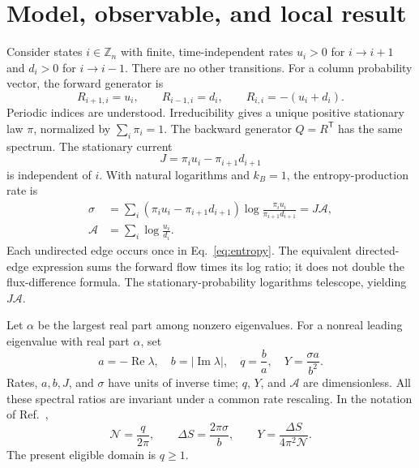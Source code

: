 \documentclass[aps,pre,onecolumn,11pt,notitlepage,nofootinbib]{revtex4-2}
\newcommand{\Repart}{\operatorname{Re}}
\newcommand{\Impart}{\operatorname{Im}}
\begin{document}
\section{Model, observable, and local result}
Consider states $i\in\mathbb Z_n$ with finite, time-independent rates $u_i>0$ for $i\to i+1$ and $d_i>0$ for $i\to i-1$. There are no other transitions. For a column probability vector, the forward generator is
\begin{equation}
 R_{i+1,i}=u_i,\qquad R_{i-1,i}=d_i,\qquad R_{i,i}=-(u_i+d_i).
 \label{eq:generator}
\end{equation}
Periodic indices are understood. Irreducibility gives a unique positive stationary law $\pi$, normalized by $\sum_i\pi_i=1$. The backward generator $Q=R^{\mathsf T}$ has the same spectrum. The stationary current
\begin{equation}
 J=\pi_i u_i-\pi_{i+1}d_{i+1}
 \label{eq:current}
\end{equation}
is independent of $i$. With natural logarithms and $k_B=1$, the entropy-production rate is
\begin{align}
 \sigma&=\sum_i(\pi_i u_i-\pi_{i+1}d_{i+1})
       \log\frac{\pi_i u_i}{\pi_{i+1}d_{i+1}}
       =J\mathcal A,\label{eq:entropy}\\
 \mathcal A&=\sum_i\log\frac{u_i}{d_i}.
\end{align}
Each undirected edge occurs once in Eq.~\eqref{eq:entropy}. The equivalent directed-edge expression sums the forward flow times its log ratio; it does not double the flux-difference formula. The stationary-probability logarithms telescope, yielding $J\mathcal A$.

Let $\alpha$ be the largest real part among nonzero eigenvalues. For a nonreal leading eigenvalue with real part $\alpha$, set
\begin{equation}
 a=-\Repart\lambda,\quad b=|\Impart\lambda|,\quad
 q=\frac ba,\quad Y=\frac{\sigma a}{b^2}.
 \label{eq:cost}
\end{equation}
Rates, $a,b,J$, and $\sigma$ have units of inverse time; $q$, $Y$, and $\mathcal A$ are dimensionless. All these spectral ratios are invariant under a common rate rescaling. In the notation of Ref.~\cite{OBS2022},
\begin{equation}
 \mathcal N=\frac{q}{2\pi},\qquad
 \Delta S=\frac{2\pi\sigma}{b},\qquad
 Y=\frac{\Delta S}{4\pi^2\mathcal N}.
\end{equation}
The present eligible domain is $q\geq1$.
\end{document}
